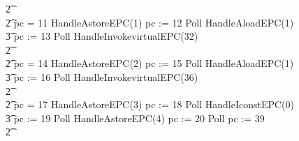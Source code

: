 \begin{figure}[t!]
\begin{circus}
    \t2 {} \cdots {} \\
    \t2 {} \circelse pc = 11 \circthen HandleAstoreEPC(1) \circseq pc := 12 \circseq Poll \circseq HandleAloadEPC(1) \circseq \\
    \t3 pc := 13 \circseq Poll \circseq HandleInvokevirtualEPC(32) \\
    \t2 {} \cdots {} \\
    \t2 {} \circelse pc = 14 \circthen HandleAstoreEPC(2) \circseq pc := 15 \circseq Poll \circseq HandleAloadEPC(1) \circseq \\
    \t3 pc := 16 \circseq Poll \circseq HandleInvokevirtualEPC(36) \\
    \t2 {} \cdots {} \\
    \t2 {} \circelse pc = 17 \circthen HandleAstoreEPC(3) \circseq pc := 18 \circseq Poll \circseq HandleIconstEPC(0) \circseq \\
    \t3 pc := 19 \circseq Poll \circseq HandleAstoreEPC(4) \circseq pc := 20 \circseq Poll \circseq pc := 39 \\
    \t2 {} \cdots {} \\

\end{circus}
\end{figure}
